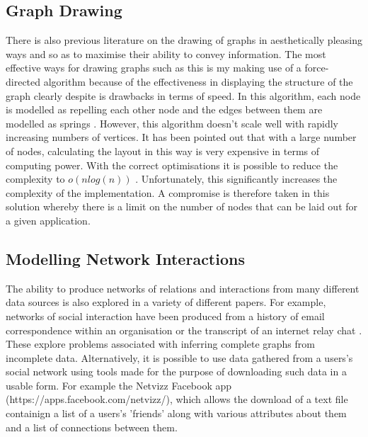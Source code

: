 \documentclass[12pt,a4paper]{article}
\begin{document}
\subsection{Graph Drawing}
\noindent
There is also previous literature on the drawing of graphs in aesthetically pleasing ways and so as to maximise their ability to convey information. The most effective ways for drawing graphs such as this is my making use of a force-directed algorithm \cite{himsolt1995comparing} because of the effectiveness in displaying the structure of the graph clearly despite is drawbacks in terms of speed. In this algorithm, each node is modelled as repelling each other node and the edges between them are modelled as springs \cite{fruchterman1991graph}. However, this algorithm doesn't scale well with rapidly increasing numbers of vertices. It has been pointed out that with a large number of nodes, calculating the layout in this way is very expensive in terms of computing power. With the correct optimisations it is possible to reduce the complexity to $o(nlog(n))$ \cite{barnes1986hierarchical}. Unfortunately, this significantly increases the complexity of the implementation. A compromise is therefore taken in this solution whereby there is a limit on the number of nodes that can be laid out for a given application.

\subsection{Modelling Network Interactions}
\noindent
The ability to produce networks of relations and interactions from many different data sources is also explored in a variety of different papers. For example, networks of social interaction have been produced from a history of email correspondence within an organisation \cite{fisher2004social} or the transcript of an internet relay chat \cite{mutton2004inferring}. These explore problems associated with inferring complete graphs from incomplete data. Alternatively, it is possible to use data gathered from a users's social network using tools made for the purpose of downloading such data in a usable form. For example the Netvizz Facebook app (https://apps.facebook.com/netvizz/), which allows the download of a text file containign a list of a users's 'friends' along with various attributes about them and a list of connections between them.
\end{document}
